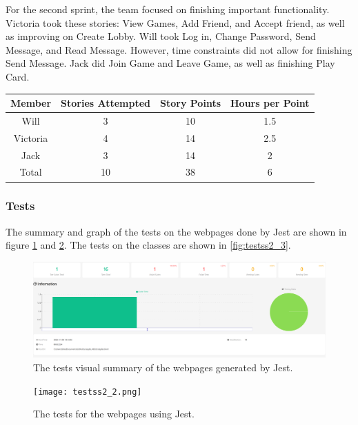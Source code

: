 \documentclass{article}
\begin{document}
For the second sprint, the team focused on finishing important functionality. Victoria took these stories: View Games, Add Friend, and Accept friend, as well as improving on Create Lobby. Will took Log in, Change Password, Send Message, and Read Message. However, time constraints did not allow for finishing Send Message. Jack did Join Game and Leave Game, as well as finishing Play Card.

\begin{table}[h]
\centering
\begin{tabular}{|c|c|c|c|}
\hline
\textbf{Member} & \textbf{Stories Attempted} & \textbf{Story Points} & \textbf{Hours per Point} \\ \hline
Will     & 3 & 10  & 1.5 \\ \hline
Victoria & 4 & 14 & 2.5 \\ \hline
Jack     & 3 & 14 & 2 \\ \hline
Total    & 10 & 38 & 6 \\ \hline
\end{tabular}
\end{table}

\subsubsection{Tests}
The summary and graph of the tests on the webpages done by Jest are shown in figure \ref{fig:testss2_1} and \ref{fig:testss2_2}. The tests on the classes are shown in \ref{fig:testss2_3}.

\begin{figure}[h]
\centering
\includegraphics[width=\linewidth]{testss2_1.png}
\caption{\label{fig:testss2_1}The tests visual summary of the webpages generated by Jest.}
\end{figure}

\begin{figure}[h]
\centering
\texttt{[image: testss2\_2.png]}
\caption{\label{fig:testss2_2}The tests for the webpages using Jest.}
\end{figure}
\end{document}
